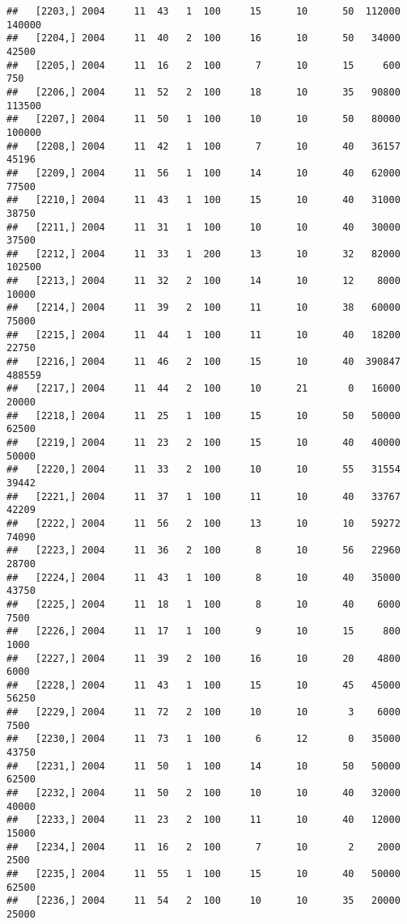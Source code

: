 \documentclass{article}\usepackage[]{graphicx}\usepackage[]{color}
\makeatletter
\newenvironment{kframe}{%
 \def\at@end@of@kframe{}%
 \ifinner\ifhmode%
  \def\at@end@of@kframe{\end{minipage}}%
  \begin{minipage}{\columnwidth}%
 \fi\fi%
 \def\FrameCommand##1{\hskip\@totalleftmargin \hskip-\fboxsep
 \colorbox{shadecolor}{##1}\hskip-\fboxsep
     \hskip-\linewidth \hskip-\@totalleftmargin \hskip\columnwidth}%
 \MakeFramed {\advance\hsize-\width
   \@totalleftmargin\z@ \linewidth\hsize
   \@setminipage}}%
 {\par\unskip\endMakeFramed%
 \at@end@of@kframe}
\newenvironment{knitrout}{}{} %
\makeatother
\begin{document}
\begin{knitrout}
\begin{kframe}
\begin{verbatim}
##   [2203,] 2004     11  43   1  100     15      10      50  112000  140000
##   [2204,] 2004     11  40   2  100     16      10      50   34000   42500
##   [2205,] 2004     11  16   2  100      7      10      15     600     750
##   [2206,] 2004     11  52   2  100     18      10      35   90800  113500
##   [2207,] 2004     11  50   1  100     10      10      50   80000  100000
##   [2208,] 2004     11  42   1  100      7      10      40   36157   45196
##   [2209,] 2004     11  56   1  100     14      10      40   62000   77500
##   [2210,] 2004     11  43   1  100     15      10      40   31000   38750
##   [2211,] 2004     11  31   1  100     10      10      40   30000   37500
##   [2212,] 2004     11  33   1  200     13      10      32   82000  102500
##   [2213,] 2004     11  32   2  100     14      10      12    8000   10000
##   [2214,] 2004     11  39   2  100     11      10      38   60000   75000
##   [2215,] 2004     11  44   1  100     11      10      40   18200   22750
##   [2216,] 2004     11  46   2  100     15      10      40  390847  488559
##   [2217,] 2004     11  44   2  100     10      21       0   16000   20000
##   [2218,] 2004     11  25   1  100     15      10      50   50000   62500
##   [2219,] 2004     11  23   2  100     15      10      40   40000   50000
##   [2220,] 2004     11  33   2  100     10      10      55   31554   39442
##   [2221,] 2004     11  37   1  100     11      10      40   33767   42209
##   [2222,] 2004     11  56   2  100     13      10      10   59272   74090
##   [2223,] 2004     11  36   2  100      8      10      56   22960   28700
##   [2224,] 2004     11  43   1  100      8      10      40   35000   43750
##   [2225,] 2004     11  18   1  100      8      10      40    6000    7500
##   [2226,] 2004     11  17   1  100      9      10      15     800    1000
##   [2227,] 2004     11  39   2  100     16      10      20    4800    6000
##   [2228,] 2004     11  43   1  100     15      10      45   45000   56250
##   [2229,] 2004     11  72   2  100     10      10       3    6000    7500
##   [2230,] 2004     11  73   1  100      6      12       0   35000   43750
##   [2231,] 2004     11  50   1  100     14      10      50   50000   62500
##   [2232,] 2004     11  50   2  100     10      10      40   32000   40000
##   [2233,] 2004     11  23   2  100     11      10      40   12000   15000
##   [2234,] 2004     11  16   2  100      7      10       2    2000    2500
##   [2235,] 2004     11  55   1  100     15      10      40   50000   62500
##   [2236,] 2004     11  54   2  100     10      10      35   20000   25000

\end{verbatim}
\end{kframe}
\end{knitrout}
\end{document}
